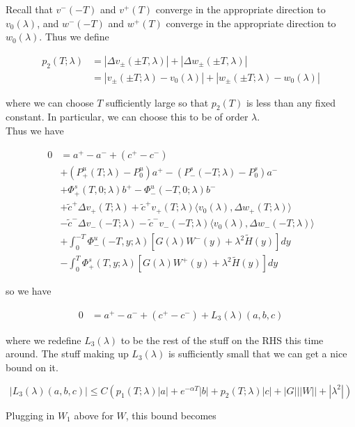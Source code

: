 \documentclass[12pt]{article}
\begin{document}
\begin{enumerate}
Recall that $v^-(-T)$ and $v^+(T)$ converge in the appropriate direction to $v_0(\lambda)$, and $w^-(-T)$ and $w^+(T)$ converge in the appropriate direction to $w_0(\lambda)$. Thus we define

\begin{align*}
p_2(T; \lambda) &= |\Delta v_\pm(\pm T, \lambda)| + |\Delta w_\pm(\pm T, \lambda)|\\
&= |v_\pm(\pm T; \lambda) - v_0(\lambda)| + |w_\pm(\pm T; \lambda) - w_0(\lambda)|
\end{align*}

where we can choose $T$ sufficiently large so that $p_2(T)$ is less than any fixed constant. In particular, we can choose this to be of order $\lambda$.\\

Thus we have

\begin{align*}
0 &= a^+ - a^- + (c^+ - c^-) \\
&+ (P^u_+(T; \lambda) - P_0^u)a^+ - (P^s_-(-T; \lambda) - P_0^s)a^- \\
&+ \Phi^s_+(T, 0; \lambda)b^+ - \Phi^u_-(-T, 0; \lambda)b^- \\
&+ \tilde{c}^+ \Delta v_+(T; \lambda) + \tilde{c}^+ v_+(T; \lambda) \langle v_0(\lambda), \Delta w_+(T; \lambda) \rangle \\
&- \tilde{c}^- \Delta v_-(-T; \lambda) - \tilde{c}^- v_-(-T; \lambda) \langle v_0(\lambda), \Delta w_-(-T; \lambda) \rangle \\
&+ \int_0^{-T} \Phi^u_-(-T, y; \lambda) [ G(\lambda)W^-(y) + \lambda^2 \tilde{H}(y) ] dy \\
&- \int_0^T \Phi^s_+(T, y; \lambda) [ G(\lambda)W^+(y) + \lambda^2 \tilde{H}(y) ] dy
\end{align*}

so we have

\begin{align*}
0 &= a^+ - a^- + (c^+ - c^-) + L_3(\lambda)(a, b, c)
\end{align*}

where we redefine $L_3(\lambda)$ to be the rest of the stuff on the RHS this time around. The stuff making up $L_3(\lambda)$ is sufficiently small that we can get a nice bound on it. 

\[
|L_3(\lambda)(a, b, c)| \leq C ( p_1(T; \lambda)|a|
+ e^{-\alpha T}|b| + p_2(T; \lambda)|c| + |G|||W|| + |\lambda^2| )
\]

Plugging in $W_1$ above for $W$, this bound becomes


\end{enumerate}
\end{document}
